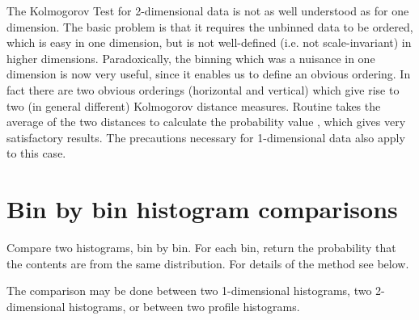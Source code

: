 The Kolmogorov Test for 2-dimensional data is not as well
understood as for one dimension.
The basic problem is that it requires the unbinned data to be
ordered, which is easy in one dimension, but is not
well-defined
(i.e. not scale-invariant) in higher dimensions.
Paradoxically, the binning which was a nuisance in one dimension
is now very useful, since it enables us to define
an obvious ordering.
In fact there are two obvious orderings (horizontal and vertical)
which give rise to two (in general different) Kolmogorov
distance measures.
Routine  takes the average of the two distances
to calculate the probability value ,
which gives very satisfactory results.
The precautions necessary for 1-dimensional data also apply to this case.
 

\section{Bin by bin histogram comparisons}


\Action Compare two histograms, bin by bin. For each bin, return the
        probability that the contents are from the same distribution.  
        For details of the method see below.

        The comparison may be done between two 1-dimensional histograms,
        two 2-dimensional histograms, or between two profile histograms.

